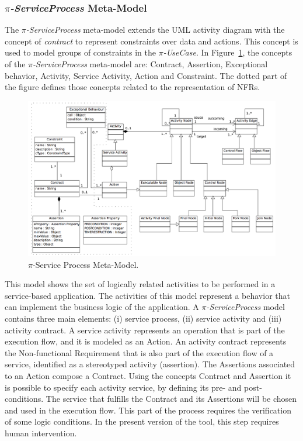 \documentclass{singlecol-new}
\theoremstyle{TH}{
\newtheorem{lemma}{Lemma}
\newtheorem{theorem}[lemma]{Theorem}
\newtheorem{corrolary}[lemma]{Corrolary}
\newtheorem{conjecture}[lemma]{Conjecture}
\newtheorem{proposition}[lemma]{Proposition}
\newtheorem{claim}[lemma]{Claim}
\newtheorem{stheorem}[lemma]{Wrong Theorem}
\newtheorem{algorithm}{Algorithm}
}
\theoremstyle{THrm}{
\newtheorem{definition}{Definition}[section]
\newtheorem{question}{Question}[section]
\newtheorem{remark}{Remark}
\newtheorem{scheme}{Scheme}
}
\theoremstyle{THhit}{
\newtheorem{case}{Case}[section]
}
\theoremstyle{THhsl}{
\newtheorem{example}{Example}
}
\begin{document}
\subsubsection{\textit{$\pi$-ServiceProcess} Meta-Model}

The \textit{$\pi$-ServiceProcess} meta-model extends the UML activity diagram with the concept of \textit{contract} to represent constraints over data and actions. This concept is used to model
groups  of  constraints  in the \textit{$\pi$-UseCase}.
In Figure~\ref{fig:CIM:serviceprocessmetamodel}, the concepts of the \textit{$\pi$-Ser\-vice\-Process} meta-model are: {\sc Contract}, {\sc Assertion}, {\sc Exceptional behavior}, {\sc Activity}, {\sc Ser\-vice Acti\-vi\-ty}, {\sc Action} and {\sc Constraint}.
The dotted part of the figure defines those concepts related to the representation of NFRs.

\begin{figure}[h]
\center
\includegraphics[width=1\textwidth]{./figures/ServiceProcessMetaModel.pdf}
\caption{\label{fig:CIM:serviceprocessmetamodel} $\pi$-Service Process Meta-Model.}
\end{figure}

This model shows the set of logically related activities to be performed in a service-based application.
The activities of this model represent a behavior that can  implement the business logic of the application.
A \textit{$\pi$-ServiceProcess}  model contains three main elements: (i) service process, (ii) service activity and (iii) activity contract. A service activity represents an operation that is part of the execution flow, and it is modeled as an {\sc Action}.
An activity contract represents the {\sc Non-functional Requirement}  that is also part of the execution flow of a service, identified  as a stereotyped activity ({\sf assertion}).
The {\sc Assertion}s associated to an {\sc Action} compose a {\sc Contract}. 
Using the concepts {\sc Contract} and {\sc Assertion} it is possible to specify each activity service, by defining its pre- and post-conditions. 
The service that fulfills the {\sc Contract} and its {\sc Assertions} will be chosen and used in the execution flow.
This part of the process requires the verification of some logic conditions.
In the present version of the tool, this step requires human intervention.
\end{document}
